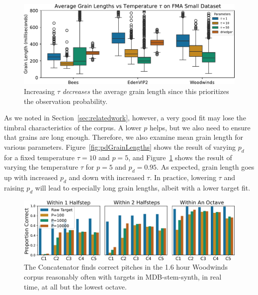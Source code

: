 \documentclass{article}
\begin{document}
\begin{figure}
    \centering
    \includegraphics[width=\columnwidth]{figs/tempGrainLengths.pdf}
    \caption{Increasing $\tau$ {\em decreases} the average grain length since this prioritizes the observation probability.}
    \label{fig:tempGrainLengths}
\end{figure}

As we noted in Section~\ref{sec:relatedwork}, however, a very good fit may lose the timbral characteristics of the corpus.  A lower $p$ helps, but we also need to ensure that grains are long enough.  Therefore, we also examine mean grain length for various parameters.  Figure~\ref{fig:pdGrainLengths} shows the result of varying $p_d$ for a fixed temperature $\tau=10$ and $p=5$, and Figure~\ref{fig:tempGrainLengths} shows the result of varying the temperature $\tau$ for $p=5$ and $p_d = 0.95$.  As expected, grain length goes up with increased $p_d$ and down with increased $\tau$.  In practice, lowering $\tau$ and raising $p_d$ will lead to especially long grain lengths, albeit with a lower target fit.

\begin{figure}
    \centering
    \includegraphics[width=\columnwidth]{figs/PitchTests.pdf}
    \caption{The Concatenator finds correct pitches in the 1.6 hour Woodwinds corpus reasonably often with targets in MDB-stem-synth, in real time, at all but the lowest octave.}
    \label{fig:PitchTests}
\end{figure}
\end{document}
